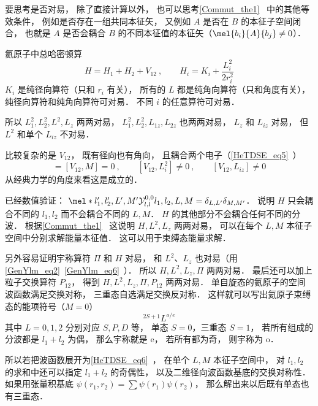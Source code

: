 
\begin{issues}
\issueDraft
\end{issues}

要思考是否对易， 除了直接计算以外， 也可以思考\autoref{Commut_the1}~ 中的其他等效条件， 例如是否存在一组共同本征矢， 又例如 $A$ 是否在 $B$ 的本征子空间闭合， 也就是 $A$ 是否会耦合 $B$ 的不同本征值的本征矢（$\mel{b_i}{A}{b_j} \ne 0$）．

氦原子中总哈密顿算
\begin{equation}
H = H_1 + H_2 + V_{12}~,
\qquad H_i = K_i + \frac{L_i^2}{2r_i^2}
\end{equation}
$K_i$ 是纯径向算符（只和 $r_i$ 有关）， 所有的 $L$ 都是纯角向算符（只和角度有关）， 纯径向算符和纯角向算符可对易． 不同 $i$ 的任意算符可对易．

所以 $L_1^2, L_2^2, L^2, L_z$ 两两对易， $L_1^2, L_2^2, L_{1z}, L_{2z}$ 也两两对易， $L_z$ 和 $L_{iz}$ 对易， 但 $L^2$ 和单个 $L_{iz}$ 不对易．

比较复杂的是 $V_{12}$， 既有径向也有角向， 且耦合两个电子（\autoref{HeTDSE_eq5}~）
\begin{equation}
[V_{12}, L^2] = [V_{12}, M] = 0~,
\qquad
[V_{12}, L_i^2] \ne 0~,
\qquad
[V_{12}, L_{iz}] \ne 0
\end{equation}
从经典力学的角度来看这是成立的．

已经数值验证： $\mel*{l'_1,l'_2,L',M'}{\mathcal Y_{l,l}^{0,0}}{l_1,l_2,L,M} = \delta_{L,L'}\delta_{M,M'}$． 说明 $H$ 只会耦合不同的 $l_1,l_2$ 而不会耦合不同的 $L,M$． $H$ 的其他部分不会耦合任何不同的分波． 根据\autoref{Commut_the1}~ 这说明 $H,L^2,L_z$ 两两对易， 可以在每个 $L,M$ 本征子空间中分别求解能量本征值． 这可以用于束缚态能量求解．

另外容易证明宇称算符 $\Pi$ 和 $H$ 对易， 和 $L^2$、$L_z$ 也对易（用\autoref{GenYlm_eq2}~\autoref{GenYlm_eq6}~）． 所以 $H,L^2,L_z,\Pi$ 两两对易． 最后还可以加上粒子交换算符 $P_{12}$， 得到 $H,L^2,L_z,\Pi, P_{12}$ 两两对易． 单自旋态的氦原子的空间波函数满足交换对称， 三重态自选满足交换反对称． 这样就可以写出氦原子束缚态的能项符号（$M=0$）
\begin{equation}
^{2S+1}L^{o/e}
\end{equation}
其中 $L=0,1,2$ 分别对应 $S,P,D$ 等， 单态 $S=0$，三重态 $S=1$， 若所有组成的分波都是 $l_1+l_2$ 为偶， 那么宇称就是 e， 若所有都为奇， 则宇称为 o．

所以若把波函数展开为\autoref{HeTDSE_eq6}~， 在单个 $L,M$ 本征子空间中， 对 $l_1,l_2$ 的求和中还可以指定 $l_1+l_2$ 的奇偶性， 以及二维径向波函数基底的交换对称性． 如果用张量积基底 $\psi(r_1,r_2) = \sum \psi(r_1)\psi(r_2)$， 那么解出来以后既有单态也有三重态．
